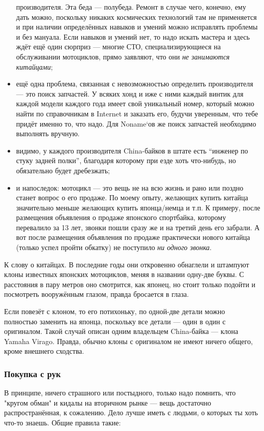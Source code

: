 \documentclass[12pt,a4paper]{article}
\begin{document}
\begin{itemize}
производителя. Эта беда --- полубеда. Ремонт в случае чего, конечно,
ему дать можно, поскольку никаких космических технологий там не
применяется и при наличии определённых навыков и умений можно
исправлять проблемы и без мануала. Если навыков и умений нет, то
надо искать мастера и здесь ждёт ещё один сюрприз --- многие СТО,
специализирующиеся на обслуживании мотоциклов, прямо заявляют,
что они \emph{не занимаются китайцами};
\item ещё одна проблема, связанная с невозможностью определить
производителя --- это поиск запчастей. У всяких хонд и иже с ними
каждый винтик для каждой модели каждого года имеет свой уникальный
номер, который можно найти по справочникам в Internet и заказать
его, будучи уверенным, что тебе придёт именно то, что надо. Для
Noname`ов же поиск запчастей необходимо выполнять вручную.
\item видимо, у каждого производителя China-байков в штате есть ``инженер
по стуку задней полки'', благодаря которому при езде хоть что-нибудь,
но обязательно будет дребезжать;
\item и напоследок: мотоцикл --- это вещь не на всю жизнь и рано или
поздно станет вопрос о его продаже. По моему опыту, желающих купить
китайца значительно меньше желающих купить японца/немца и т.п. К
примеру, после размещения объявления о продаже японского спортбайка,
которому перевалило за 13 лет, звонки пошли сразу же и на третий день
его забрали. А вот после размещения объявления по продаже практически
нового китайца (только успел пройти обкатку) не поступило
\emph{ни одного звонка}.
\end{itemize}

К слову о китайцах. В последние годы они откровенно обнаглели и
штампуют клоны известных японских мотоциклов, меняя в названии одну-две
буквы. С расстояния в пару метров оно смотрится, как японец, но стоит
только подойти и посмотреть вооружённым глазом, правда бросается в
глаза.

Если повезёт с клоном, то его потихоньку, по одной-две детали можно
полностью заменить на японца, поскольку все детали --- один в один с
оригиналом. Такой случай описан одним владельцем China-байка ---
клона Yamaha Virago. Правда, обычно клоны с оригиналом не имеют ничего
общего, кроме внешнего сходства.

\subsubsection{Покупка с рук}

В принципе, ничего страшного или постыдного, только надо помнить,
что "кругом обман" и кидалы на вторичном рынке --- вещь достаточно
распространённая, к сожалению. Дело лучше иметь с людьми, о которых
ты хоть что-то знаешь. Общие правила такие:
\end{document}
